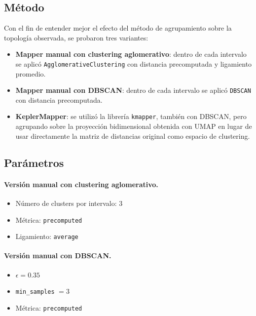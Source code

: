 \documentclass[12pt]{article}
\begin{document}
\subsection{M\'etodo}

Con el fin de entender mejor el efecto del m\'etodo de agrupamiento sobre la topolog\'ia observada, se probaron tres variantes:

\begin{itemize}
    \item \textbf{Mapper manual con clustering aglomerativo}: dentro de cada intervalo se aplic\'o \texttt{AgglomerativeClustering} con distancia precomputada y ligamiento promedio.
    \item \textbf{Mapper manual con DBSCAN}: dentro de cada intervalo se aplic\'o \texttt{DBSCAN} con distancia precomputada.
    \item \textbf{KeplerMapper}: se utiliz\'o la librer\'ia \texttt{kmapper}, tambi\'en con DBSCAN, pero agrupando sobre la proyecci\'on bidimensional obtenida con UMAP en lugar de usar directamente la matriz de distancias original como espacio de clustering.
\end{itemize}

\subsection{Par\'ametros}

\paragraph{Versi\'on manual con clustering aglomerativo.}
\begin{itemize}
    \item N\'umero de clusters por intervalo: $3$
    \item M\'etrica: \texttt{precomputed}
    \item Ligamiento: \texttt{average}
\end{itemize}

\paragraph{Versi\'on manual con DBSCAN.}
\begin{itemize}
    \item $\epsilon = 0.35$
    \item \texttt{min\_samples} $= 3$
    \item M\'etrica: \texttt{precomputed}
\end{itemize}
\end{document}
